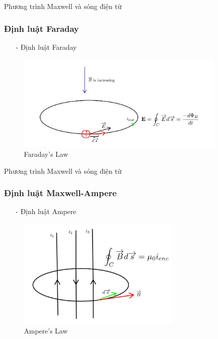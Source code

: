 \documentclass[8pt]{beamer}
\begin{document}
\begin{frame}{Phương trình Maxwell và sóng điện từ}
\subsubsection{Định luật Faraday}
\begin{itemize}
	\item[-] Định luật Faraday
\end{itemize}
\begin{figure}[h]
			\includegraphics[width=0.9\textwidth]{faraday.jpg}
			\caption{Faraday's Law}			\label{fig:re7}
		\end{figure}

\end{frame}
\begin{frame}{Phương trình Maxwell và sóng điện từ}
\subsubsection{Định luật Maxwell-Ampere}
\begin{itemize}
\item[-] Định luật Ampere
\end{itemize}
\begin{figure}[h]
			\includegraphics[width=0.7\textwidth]{ampere.jpg}
			\caption{Ampere's Law}\label{fig:re8}
		\end{figure}


\end{frame}
\end{document}
